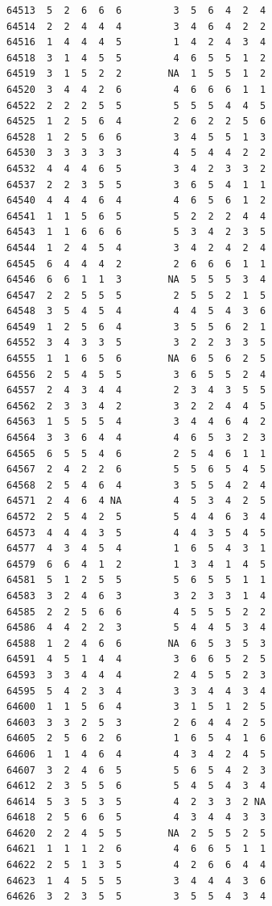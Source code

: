 \documentclass[
  letterpaper,
  DIV=11,
  numbers=noendperiod]{scrreprt}
\begin{document}
\begin{verbatim}
64513  5  2  6  6  6         3  5  6  4  2  4
64514  2  2  4  4  4         3  4  6  4  2  2
64516  1  4  4  4  5         1  4  2  4  3  4
64518  3  1  4  5  5         4  6  5  5  1  2
64519  3  1  5  2  2        NA  1  5  5  1  2
64520  3  4  4  2  6         4  6  6  6  1  1
64522  2  2  2  5  5         5  5  5  4  4  5
64525  1  2  5  6  4         2  6  2  2  5  6
64528  1  2  5  6  6         3  4  5  5  1  3
64530  3  3  3  3  3         4  5  4  4  2  2
64532  4  4  4  6  5         3  4  2  3  3  2
64537  2  2  3  5  5         3  6  5  4  1  1
64540  4  4  4  6  4         4  6  5  6  1  2
64541  1  1  5  6  5         5  2  2  2  4  4
64543  1  1  6  6  6         5  3  4  2  3  5
64544  1  2  4  5  4         3  4  2  4  2  4
64545  6  4  4  4  2         2  6  6  6  1  1
64546  6  6  1  1  3        NA  5  5  5  3  4
64547  2  2  5  5  5         2  5  5  2  1  5
64548  3  5  4  5  4         4  4  5  4  3  6
64549  1  2  5  6  4         3  5  5  6  2  1
64552  3  4  3  3  5         3  2  2  3  3  5
64555  1  1  6  5  6        NA  6  5  6  2  5
64556  2  5  4  5  5         3  6  5  5  2  4
64557  2  4  3  4  4         2  3  4  3  5  5
64562  2  3  3  4  2         3  2  2  4  4  5
64563  1  5  5  5  4         3  4  4  6  4  2
64564  3  3  6  4  4         4  6  5  3  2  3
64565  6  5  5  4  6         2  5  4  6  1  1
64567  2  4  2  2  6         5  5  6  5  4  5
64568  2  5  4  6  4         3  5  5  4  2  4
64571  2  4  6  4 NA         4  5  3  4  2  5
64572  2  5  4  2  5         5  4  4  6  3  4
64573  4  4  4  3  5         4  4  3  5  4  5
64577  4  3  4  5  4         1  6  5  4  3  1
64579  6  6  4  1  2         1  3  4  1  4  5
64581  5  1  2  5  5         5  6  5  5  1  1
64583  3  2  4  6  3         3  2  3  3  1  4
64585  2  2  5  6  6         4  5  5  5  2  2
64586  4  4  2  2  3         5  4  4  5  3  4
64588  1  2  4  6  6        NA  6  5  3  5  3
64591  4  5  1  4  4         3  6  6  5  2  5
64593  3  3  4  4  4         2  4  5  5  2  3
64595  5  4  2  3  4         3  3  4  4  3  4
64600  1  1  5  6  4         3  1  5  1  2  5
64603  3  3  2  5  3         2  6  4  4  2  5
64605  2  5  6  2  6         1  6  5  4  1  6
64606  1  1  4  6  4         4  3  4  2  4  5
64607  3  2  4  6  5         5  6  5  4  2  3
64612  2  3  5  5  6         5  4  5  4  3  4
64614  5  3  5  3  5         4  2  3  3  2 NA
64618  2  5  6  6  5         4  3  4  4  3  3
64620  2  2  4  5  5        NA  2  5  5  2  5
64621  1  1  1  2  6         4  6  6  5  1  1
64622  2  5  1  3  5         4  2  6  6  4  4
64623  1  4  5  5  5         3  4  4  4  3  6
64626  3  2  3  5  5         3  5  5  4  3  4

\end{verbatim}
\end{document}
